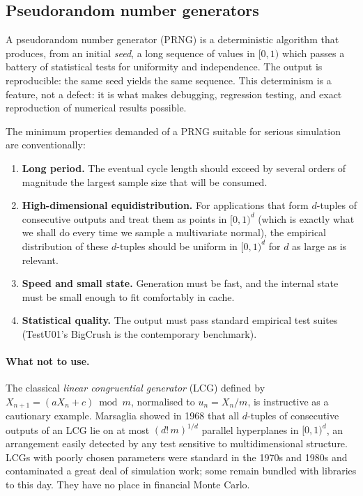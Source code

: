\documentclass[11pt,a4paper]{article}
\theoremstyle{plain}
\theoremstyle{definition}
\theoremstyle{remark}
\begin{document}
\subsection{Pseudorandom number generators}
\label{sec:prng}

A pseudorandom number generator (PRNG) is a deterministic algorithm
that produces, from an initial \emph{seed}, a long sequence of values in
$[0,1)$ which passes a battery of statistical tests for uniformity and
independence. The output is reproducible: the same seed yields the same
sequence. This determinism is a feature, not a defect: it is what makes
debugging, regression testing, and exact reproduction of numerical
results possible.

The minimum properties demanded of a PRNG suitable for serious
simulation are conventionally:
\begin{enumerate}
\item \textbf{Long period.} The eventual cycle length should exceed by
several orders of magnitude the largest sample size that will be
consumed.
\item \textbf{High-dimensional equidistribution.} For applications that
form $d$-tuples of consecutive outputs and treat them as points in
$[0,1)^d$ (which is exactly what we shall do every time we sample a
multivariate normal), the empirical distribution of these $d$-tuples
should be uniform in $[0,1)^d$ for $d$ as large as is relevant.
\item \textbf{Speed and small state.} Generation must be fast, and the
internal state must be small enough to fit comfortably in cache.
\item \textbf{Statistical quality.} The output must pass standard
empirical test suites (TestU01's BigCrush is the contemporary
benchmark).
\end{enumerate}

\paragraph{What not to use.} The classical \emph{linear congruential
generator} (LCG) defined by $X_{n+1} = (a X_n + c) \bmod m$, normalised
to $u_n = X_n/m$, is instructive as a cautionary example. Marsaglia
showed in 1968 that all $d$-tuples of consecutive outputs of an LCG lie
on at most $(d!\,m)^{1/d}$ parallel hyperplanes in $[0,1)^d$, an
arrangement easily detected by any test sensitive to multidimensional
structure. LCGs with poorly chosen parameters were standard in the
1970s and 1980s and contaminated a great deal of simulation work; some
remain bundled with libraries to this day. They have no place in
financial Monte Carlo.
\end{document}

